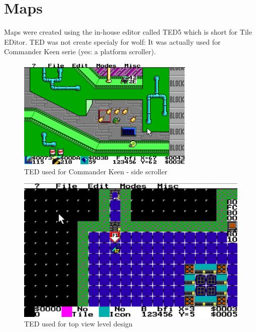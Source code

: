 \documentclass[book.tex]{subfiles}
\begin{document}
\section{Maps}
Maps were created using the in-house editor called TED5 which is short for Tile EDitor. TED was not create specialy for wolf: It was actually used for Commander Keen serie (yes: a platform scroller).\\

 \begin{figure}[H]
\centering
 \includegraphics[width=\textwidth]{imgs/ted5_scrolling_map.png}
 \caption{TED used for Commander Keen - side scroller} \label{fig:mips}
 \end{figure}


\begin{figure}[H]
\centering
 \includegraphics[width=\textwidth]{imgs/TED.png}
 \caption{TED used for top view level design} \label{fig:mips}
 \end{figure}
\end{document}
